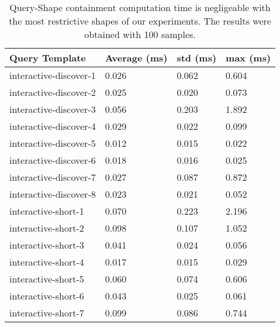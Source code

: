 \begin{table}
	\begin{center}
		\begin{tabular}{|l|l|l|l|}
			\hline
			Query Template & Average (ms) & std (ms) & max (ms) \\
			\hline
			interactive-discover-1 & 0.026 & 0.062 & 0.604 \\
			\hline
			interactive-discover-2 & 0.025 & 0.020 & 0.073 \\
			\hline
			interactive-discover-3 & 0.056 & 0.203 & 1.892 \\
			\hline
			interactive-discover-4 & 0.029 & 0.022 & 0.099 \\
			\hline
			interactive-discover-5 & 0.012 & 0.015 & 0.022 \\
			\hline
			interactive-discover-6 & 0.018 & 0.016 & 0.025 \\
			\hline
			interactive-discover-7 & 0.027 & 0.087 & 0.872 \\
			\hline
			interactive-discover-8 & 0.023 & 0.021 & 0.052 \\
			\hline
			interactive-short-1 & 0.070 & 0.223 & 2.196 \\
			\hline
			interactive-short-2 & 0.098 & 0.107 & 1.052 \\
			\hline
			interactive-short-3 & 0.041 & 0.024 & 0.056 \\
			\hline
			interactive-short-4 & 0.017 & 0.015 & 0.029 \\
			\hline
			interactive-short-5 & 0.060 & 0.074 & 0.606 \\
			\hline
			interactive-short-6 & 0.043 & 0.025 & 0.061 \\
			\hline
			interactive-short-7 & 0.099 & 0.086 & 0.744 \\
			\hline
		\end{tabular}
	\end{center}
	\caption{Query-Shape containment computation time is negligeable with the most restrictive shapes of our experiments. The results were obtained with 100 samples.}
	\label{tab:queryShapeContainmentEval}
\end{table}